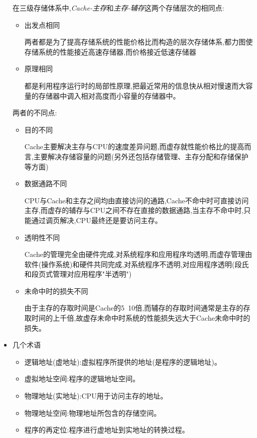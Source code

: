 \documentclass[UTF8,a4paper]{ctexart}%
\begin{document}
\begin{itemize}
                在三级存储体系中,\emph{Cache-主存}和\emph{主存-辅存}这两个存储层次的相同点:
                \begin{itemize}
                  \item 出发点相同

                      两者都是为了提高存储系统的性能价格比而构造的层次存储体系,都力图使存储系统的性能接近高速存储器,而价格接近低速存储器

                  \item 原理相同

                      都是利用程序运行时的局部性原理,把最近常用的信息快从相对慢速而大容量的存储器中调入相对高度而小容量的存储器中。
                \end{itemize}

                两者的不同点:
                \begin{itemize}
                  \item 目的不同

                      Cache主要解决主存与CPU的速度差异问题,而虚存就性能价格比的提高而言,主要解决存储容量的问题(另外还包括存储管理、主存分配和存储保护等方面)

                  \item 数据通路不同

                      CPU与Cache和主存之间均由直接访问的通路,Cache不命中时可直接访问主存,而虚存的辅存与CPU之间不存在直接的数据通路,当主存不命中时,只能通过调页解决,CPU最终还是要访问主存。

                  \item 透明性不同

                      Cache的管理完全由硬件完成,对系统程序和应用程序均透明,而虚存管理由软件(操作系统)和硬件共同完成,对系统程序不透明,对应用程序透明(段氏和段页式管理对应用程序"半透明")

                  \item 未命中时的损失不同

                      由于主存的存取时间是Cache的5~10倍,而辅存的存取时间通常是主存的存取时间的上千倍,故虚存未命中时系统的性能损失远大于Cache未命中时的损失。
                \end{itemize}

            \item 几个术语
                \begin{itemize}
                  \item 逻辑地址(虚地址):虚拟程序所提供的地址(是程序的逻辑地址)。

                  \item 虚拟地址空间:程序的逻辑地址空间。

                  \item 物理地址(实地址):CPU用于访问主存的地址。

                  \item 物理地址空间:物理地址所包含的存储空间。

                  \item 程序的再定位:程序进行虚地址到实地址的转换过程。
                \end{itemize}
          \end{itemize}
\end{document}
